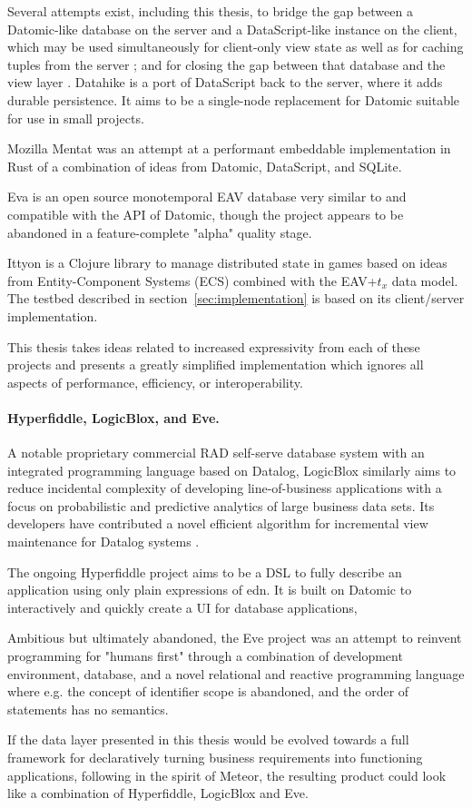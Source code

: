 Several attempts exist, including this thesis, to bridge the gap between a Datomic-like database on the server and a DataScript-like instance on the client, which may be used simultaneously for client-only view state as well as for caching tuples from the server \cite{small16datscript}; and for closing the gap between that database and the view layer \cite{parker15posh,krivosheev19reposh}. Datahike \cite{datahike} is a port of DataScript back to the server, where it adds durable persistence. It aims to be a single-node replacement for Datomic suitable for use in small projects.

Mozilla Mentat \cite{mozillamentat} was an attempt at a performant embeddable implementation in Rust of a combination of ideas from Datomic, DataScript, and SQLite.

Eva \cite{eva} is an open source monotemporal EAV database very similar to and compatible with the \gls{API} of Datomic, though the project appears to be abandoned in a feature-complete "alpha" quality stage.

Ittyon \cite{ittyon} is a Clojure library to manage distributed state in games based on ideas from Entity-Component Systems (ECS) combined with the EAV+$t_x$ data model. The testbed described in section~\ref{sec:implementation} is based on its client/server implementation.

This thesis takes ideas related to increased expressivity from each of these projects and presents a greatly simplified implementation which ignores all aspects of performance, efficiency, or interoperability.

\paragraph{Hyperfiddle, LogicBlox, and Eve.} A notable proprietary commercial RAD self-serve database system with an integrated programming language based on Datalog, LogicBlox \cite{aref2015design} similarly aims to reduce incidental complexity of developing line-of-business applications with a focus on probabilistic and predictive analytics of large business data sets. Its developers have contributed a novel efficient algorithm for incremental view maintenance for Datalog systems \cite{veldhuizen2012leapfrog}.

The ongoing Hyperfiddle project \cite{getz18hyperfiddle} aims to be a \gls{DSL} to fully describe an application using only plain expressions of \gls{edn}. It is built on Datomic to interactively and quickly create a \gls{UI} for database applications,

Ambitious but ultimately abandoned, the Eve project \cite{eve} was an attempt to reinvent programming for "humans first" through a combination of development environment, database, and a novel relational and reactive programming language where e.g. the concept of identifier scope is abandoned, and the order of statements has no semantics.

If the data layer presented in this thesis would be evolved towards a full framework for declaratively turning business requirements into functioning applications, following in the spirit of Meteor, the resulting product could look like a combination of Hyperfiddle, LogicBlox and Eve.
